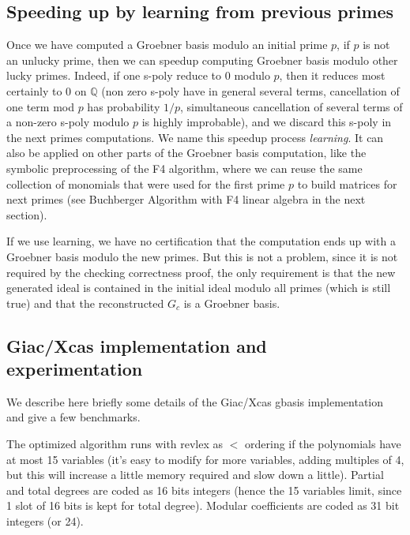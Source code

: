 \documentclass[a4paper,11pt]{article}
\newcommand{\Q}{{\mathbb{Q}}}
\begin{document}
\begin{giacjshere}
\subsection{Speeding up by learning from previous primes} \label{sec:learning}
Once we have computed a Groebner basis modulo an initial prime $p$, if $p$ is
not an unlucky prime, then we can speedup computing Groebner basis
modulo other lucky primes. Indeed, if one s-poly reduce to 0 modulo
$p$, then it reduces most certainly to 0 on $\Q$ (non zero s-poly have
in general several terms, cancellation of one term mod $p$ has
probability $1/p$, simultaneous cancellation of several terms of a non-zero
s-poly modulo $p$ is highly improbable), and we discard this s-poly in the
next primes computations. We name this speedup process {\em learning}. 
It can also
be applied on other parts of the Groebner basis computation, like the
symbolic preprocessing of the F4 algorithm, where we can reuse the
same collection of monomials that were used for the first prime $p$ 
to build matrices for next primes (see Buchberger Algorithm with F4 
linear algebra in the next section).

If we use learning, we have no certification that the computation ends up
with a Groebner basis modulo the new primes. But this is not a problem,
since it is not required by the checking correctness proof, the only
requirement is that the new generated ideal is contained in the
initial ideal modulo all primes (which is still true) and 
that the reconstructed $G_c$ is a Groebner basis.

\subsection{Giac/Xcas implementation and experimentation} \label{sec:giacf4}
We describe here briefly some details of the Giac/Xcas gbasis implementation
and give a few benchmarks.

The optimized algorithm runs with revlex as $<$ ordering
if the polynomials have at most 15
variables (it's easy to modify for more variables, adding multiples of
4, but this will increase a little memory required and
slow down a little).
Partial and total degrees are coded as 16 bits integers (hence the 15
variables limit, since 1 slot of 16 bits is kept for total degree). 
Modular coefficients are coded as 31 bit integers (or 24).


\end{giacjshere}
\end{document}
